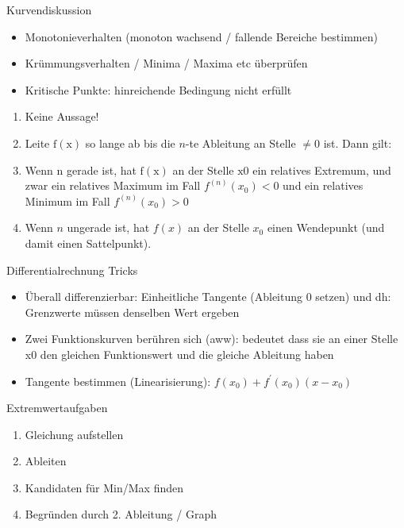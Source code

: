 \begin{KR}{Kurvendiskussion}
    \begin{itemize}
  \item Monotonieverhalten (monoton wachsend / fallende Bereiche bestimmen)
  \item Krümmungsverhalten / Minima / Maxima etc überprüfen
  \item Kritische Punkte: hinreichende Bedingung nicht erfüllt
\end{itemize}

\begin{enumerate}
  \item Keine Aussage!

  \item Leite $\mathrm{f}(\mathrm{x})$ so lange ab bis die $n$-te Ableitung an Stelle $\neq 0$ ist. Dann gilt:

  \item Wenn $\mathrm{n}$ gerade ist, hat $\mathrm{f}(\mathrm{x})$ an der Stelle $\mathrm{x} 0$ ein relatives Extremum, und zwar ein relatives Maximum im Fall $f^{(n)}\left(x_{0}\right)<0$ und ein relatives Minimum im Fall $f^{(n)}\left(x_{0}\right)>0$

  \item Wenn $n$ ungerade ist, hat $f(x)$ an der Stelle $x_{0}$ einen Wendepunkt (und damit einen Sattelpunkt).

\end{enumerate}
\end{KR}

\begin{KR}{Differentialrechnung Tricks}
    \begin{itemize}
  \item Überall differenzierbar: Einheitliche Tangente (Ableitung 0 setzen) und dh: Grenzwerte müssen denselben Wert ergeben
  \item Zwei Funktionskurven berühren sich (aww): bedeutet dass sie an einer Stelle x0 den gleichen Funktionswert und die gleiche Ableitung haben
  \item Tangente bestimmen (Linearisierung): $f\left(x_{0}\right)+f^{\prime}\left(x_{0}\right)\left(x-x_{0}\right)$
\end{itemize}
\end{KR}

\begin{KR}{Extremwertaufgaben}
    \begin{enumerate}
  \item Gleichung aufstellen

  \item Ableiten

  \item Kandidaten für Min/Max finden

  \item Begründen durch 2. Ableitung / Graph

\end{enumerate}
\end{KR}

